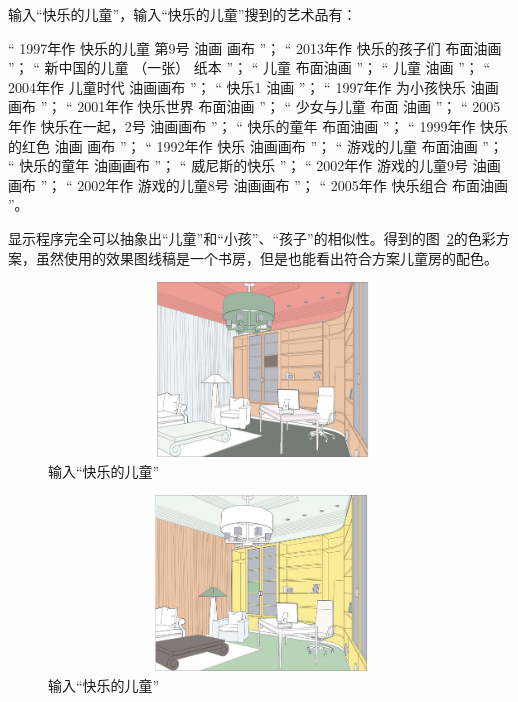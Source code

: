 输入“快乐的儿童”，输入“快乐的儿童”搜到的艺术品有：

\footnotesize
“ 1997年作 快乐的儿童 第9号 油画 画布 ”；
“ 2013年作 快乐的孩子们 布面油画 ”；
“ 新中国的儿童 （一张） 纸本 ”；
“ 儿童 布面油画 ”；
“ 儿童 油画 ”；
“ 2004年作 儿童时代 油画画布 ”；
“ 快乐1 油画 ”；
“ 1997年作 为小孩快乐 油画画布 ”；
“ 2001年作 快乐世界 布面油画 ”；
“ 少女与儿童 布面 油画 ”；
“ 2005年作 快乐在一起，2号 油画画布 ”；
“ 快乐的童年 布面油画 ”；
“ 1999年作 快乐的红色 油画 画布 ”；
“ 1992年作 快乐 油画画布 ”；
“ 游戏的儿童 布面油画 ”；
“ 快乐的童年 油画画布 ”；
“ 威尼斯的快乐 ”；
“ 2002年作 游戏的儿童9号 油画画布 ”；
“ 2002年作 游戏的儿童8号 油画画布 ”；
“ 2005年作 快乐组合 布面油画 ”。

\normalsize
显示程序完全可以抽象出“儿童”和“小孩”、“孩子”的相似性。得到的图~\ref{figure:儿童2}的色彩方案，虽然使用的效果图线稿是一个书房，但是也能看出符合方案儿童房的配色。

\begin{figure}[!htbp]
\centering
\includegraphics[width=\linewidth,keepaspectratio]{data/chapter-4/快乐儿童2.jpg}
\caption{输入“快乐的儿童”}
\label{figure:儿童2}
\end{figure}

\begin{figure}[!htbp]
\centering
\includegraphics[width=\linewidth,keepaspectratio]{data/chapter-4/快乐儿童3.jpg}
\caption{输入“快乐的儿童”}
\label{figure:儿童2}
\end{figure}



